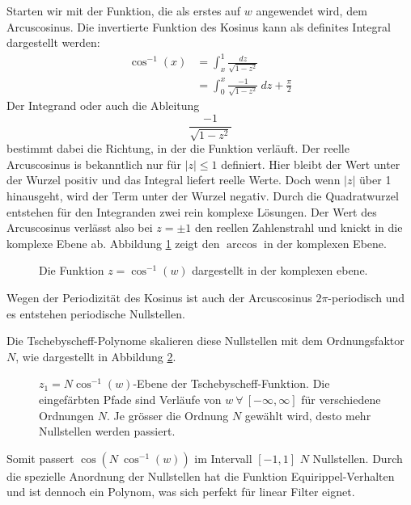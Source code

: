 \begin{refsection}
Starten wir mit der Funktion, die als erstes auf $w$ angewendet wird, dem Arcuscosinus.
Die invertierte Funktion des Kosinus kann als definites Integral dargestellt werden:
\begin{align}
    \cos^{-1}(x)
    &=
    \int_{x}^{1}
    \frac{
        dz
    }{
        \sqrt{
            1-z^2
        }
    }\\
    &=
    \int_{0}^{x}
    \frac{
        -1
    }{
        \sqrt{
            1-z^2
        }
    }
    ~dz
    + \frac{\pi}{2}
\end{align}
Der Integrand oder auch die Ableitung
\begin{equation}
    \frac{
        -1
    }{
        \sqrt{
            1-z^2
        }
    }
\end{equation}
bestimmt dabei die Richtung, in der die Funktion verläuft.
Der reelle Arcuscosinus is bekanntlich nur für $|z| \leq 1$ definiert.
Hier bleibt der Wert unter der Wurzel positiv und das Integral liefert reelle Werte.
Doch wenn $|z|$ über 1 hinausgeht, wird der Term unter der Wurzel negativ.
Durch die Quadratwurzel entstehen für den Integranden zwei rein komplexe Lösungen.
Der Wert des Arcuscosinus verlässt also bei $z= \pm 1$ den reellen Zahlenstrahl und knickt in die komplexe Ebene ab.
Abbildung \ref{ellfilter:fig:arccos} zeigt den $\arccos$ in der komplexen Ebene.
\begin{figure}
    \centering
    
    \caption{Die Funktion $z = \cos^{-1}(w)$ dargestellt in der komplexen ebene.}
    \label{ellfilter:fig:arccos}
\end{figure}
Wegen der Periodizität des Kosinus ist auch der Arcuscosinus $2\pi$-periodisch und es entstehen periodische Nullstellen.

Die Tschebyscheff-Polynome skalieren diese Nullstellen mit dem Ordnungsfaktor $N$, wie dargestellt in Abbildung \ref{ellfilter:fig:arccos2}.
\begin{figure}
    \centering
    
    \caption{
        $z_1=N \cos^{-1}(w)$-Ebene der Tschebyscheff-Funktion.
        Die eingefärbten Pfade sind Verläufe von $w~\forall~[-\infty, \infty]$ für verschiedene Ordnungen $N$.
        Je grösser die Ordnung $N$ gewählt wird, desto mehr Nullstellen werden passiert.
    }
    \label{ellfilter:fig:arccos2}
\end{figure}
Somit passert $\cos( N~\cos^{-1}(w))$ im Intervall $[-1, 1]$ $N$ Nullstellen.
Durch die spezielle Anordnung der Nullstellen hat die Funktion Equirippel-Verhalten und ist dennoch ein Polynom, was sich perfekt für linear Filter eignet.


\end{refsection}
